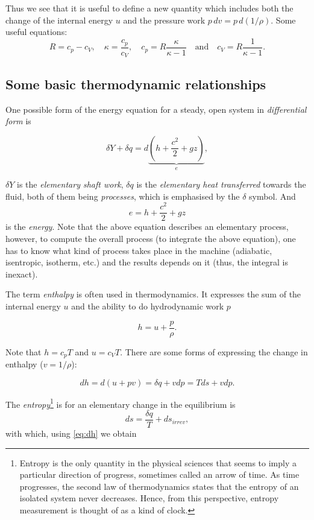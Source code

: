 Thus we see that it is useful to define a new quantity which includes both the change of the internal energy $u$ and the pressure work $p\,dv=p\, d\left( 1/\rho \right)$. Some useful equations:
%
\begin{equation}
R=c_p-c_V, \quad \kappa=\frac{c_p}{c_V}, \quad c_p=R \frac{\kappa}{\kappa-1} \quad \text{and} \quad c_V=R\frac{1}{\kappa-1}.
\end{equation}

\subsection{Some basic thermodynamic relationships}

One possible form of the energy equation for a steady, open system in \emph{differential form} is

\begin{equation}
\delta Y + \delta q = d  \underbrace{ \left(h +\frac{c^2}{2}+gz\right)}_{e},
\label{eq:first_law_of_thermodynamics}
\end{equation}

\noindent $\delta Y$ is the \emph{elementary shaft work}, $\delta q$ is the \emph{elementary heat transferred} towards the fluid, both of them being \emph{processes}, which is emphasised by the $\delta$ symbol. And $$ e = h +\frac{c^2}{2}+gz $$ is the \emph{energy}.
Note that the above equation describes an elementary process, however, to compute the overall process (to integrate the above equation), one has to know what kind of process takes place in the machine (adiabatic, isentropic, isotherm, etc.) and the results depends on it (thus, the integral is inexact).

The term \emph{enthalpy} is often used in thermodynamics. It expresses the sum of the internal energy $u$ and the ability to do hydrodynamic work $p$

\begin{equation}
h=u+\frac{p}{\rho}.
\end{equation}

\noindent Note that $h=c_p T$ and $u=c_V T$. There are some forms of expressing the change in enthalpy ($v=1/\rho$):

\begin{equation}
d h=d (u+pv) = \delta q + v dp = Tds+v dp.
\label{eq:dh}
\end{equation}

The \emph{entropy}\footnote{Entropy is the only quantity in the physical sciences that seems to imply a particular direction of progress, sometimes called an arrow of time. As time progresses, the second law of thermodynamics states that the entropy of an isolated system never decreases. Hence, from this perspective, entropy measurement is thought of as a kind of clock.} is for an elementary change in the equilibrium is
%
\begin{equation}
d s=\frac{\delta q}{T} + d s_{irrev},
\end{equation}
%
with which, using \eqref{eq:dh} we obtain

